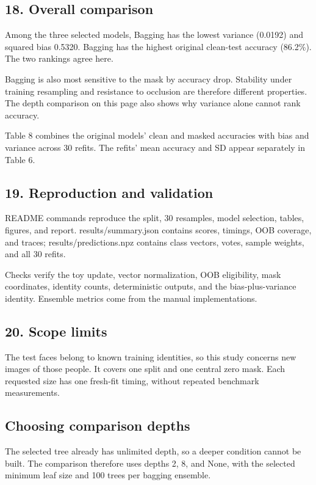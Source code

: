 \documentclass[10pt,twocolumn,letterpaper]{article}
\begin{document}
\subsection*{18. Overall comparison}
Among the three selected models, Bagging has the lowest variance (0.0192) and squared bias 0.5320. Bagging has the highest original clean-test accuracy (86.2\%). The two rankings agree here.

Bagging is also most sensitive to the mask by accuracy drop. Stability under training resampling and resistance to occlusion are therefore different properties. The depth comparison on this page also shows why variance alone cannot rank accuracy.

Table 8 combines the original models' clean and masked accuracies with bias and variance across 30 refits. The refits' mean accuracy and SD appear separately in Table 6.

\subsection*{19. Reproduction and validation}
README commands reproduce the split, 30 resamples, model selection, tables, figures, and report. results/summary.json contains scores, timings, OOB coverage, and traces; results/predictions.npz contains class vectors, votes, sample weights, and all 30 refits.

Checks verify the toy update, vector normalization, OOB eligibility, mask coordinates, identity counts, deterministic outputs, and the bias-plus-variance identity. Ensemble metrics come from the manual implementations.

\subsection*{20. Scope limits}
The test faces belong to known training identities, so this study concerns new images of those people. It covers one split and one central zero mask. Each requested size has one fresh-fit timing, without repeated benchmark measurements.

\newpage
\subsection*{Choosing comparison depths}
The selected tree already has unlimited depth, so a deeper condition cannot be built. The comparison therefore uses depths 2, 8, and None, with the selected minimum leaf size and 100 trees per bagging ensemble.
\end{document}
